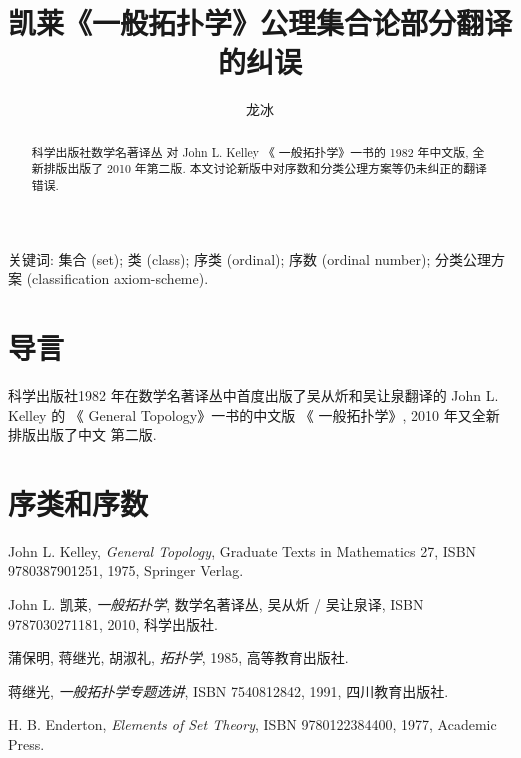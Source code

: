 \documentclass[zihao=-4,a4paper]{ctexart}
\title{凯莱《一般拓扑学》公理集合论部分翻译的纠误}
\author{龙\quad 冰}
\date{}
\begin{document}
\maketitle
\begin{abstract}
科学出版社数学名著译丛 对 John L. Kelley 《 一般拓扑学》一书的 1982 年中文版, 全新排版出版了 2010 年第二版.
本文讨论新版中对序数和分类公理方案等仍未纠正的翻译错误.
\end{abstract}
	
关键词: 集合 (set); 类 (class); 序类 (ordinal); 
	序数 (ordinal number); 
	分类公理方案 (classification axiom-scheme).
	
	
	
\section{导言}
科学出版社1982 年在数学名著译丛中首度出版了吴从炘和吴让泉翻译的  John L. Kelley 的 《 General  Topology》\cite{jkelley1975}一书的中文版 《 一般拓扑学》, 2010 年又全新排版出版了中文 第二版\cite{jkelley2010zh}.

	
\section{序类和序数 }
	
	

	
\begin{thebibliography}{9}
	John L. Kelley,  \emph{General Topology}, Graduate Texts in Mathematics 27, ISBN 9780387901251, 1975, Springer Verlag.
	
John L. 凯莱,  \emph{一般拓扑学}, 数学名著译丛, 吴从炘 / 吴让泉译, ISBN 9787030271181, 2010, 科学出版社.

蒲保明, 蒋继光, 胡淑礼, \emph{拓扑学}, 1985, 高等教育出版社.

	蒋继光, \emph{一般拓扑学专题选讲}, ISBN 7540812842, 1991, 四川教育出版社.
	
	H. B. Enderton, \emph{Elements of Set Theory}, ISBN 9780122384400, 1977, Academic Press.
\end{thebibliography}
\end{document}
